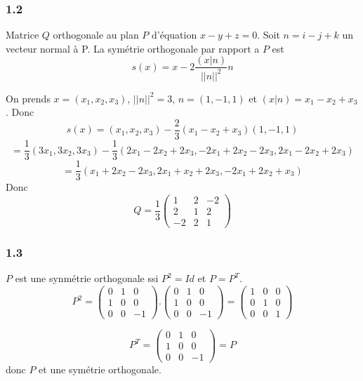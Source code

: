 \documentclass[]{book}
\theoremstyle{definition}
\begin{document}
\subsubsection*{1.2}
Matrice $Q$ orthogonale au plan $P$ d'\'equation $x-y+z=0$.
Soit $n = i-j+k$ un vecteur normal \`a P. La sym\'etrie orthogonale par rapport a $P$ est 
$$s(x) = x -2 \frac{(x|n)}{||n||^2}n$$

On prends $x=(x_1, x_2, x_3)$,  $||n||^2 = 3$, $n=(1,-1,1)$ et $(x|n) = x_1-x_2+x_3$. Donc
$$s(x) = (x_1, x_2, x_3) - \frac{2}{3}(x_1-x_2+x_3)(1,-1,1) $$
$$ = \frac{1}{3}(3x_1, 3x_2, 3x_3) - \frac{1}{3} (2x_1-2x_2+2x_3, -2x_1+2x_2-2x_3, 2x_1-2x_2+2x_3)$$
$$ = \frac{1}{3}(x_1+2x_2-2x_3, 2x_1+x_2+2x_3, -2x_1+2x_2+x_3)$$
Donc
$$ Q = \frac{1}{3}\begin{pmatrix} 1 & 2 & -2 \\ 2 & 1 & 2 \\ -2 & 2 & 1 \end{pmatrix} $$


\subsubsection*{1.3}
$P$ est une synm\'etrie orthogonale ssi $P^2 = Id$ et $P=P^T$.
$$
P^2 = \begin{pmatrix} 0 & 1 & 0 \\ 1 & 0 & 0 \\ 0 & 0 & -1 \end{pmatrix}.\begin{pmatrix} 0 & 1 & 0 \\ 1 & 0 & 0 \\ 0 & 0 & -1 \end{pmatrix} = \begin{pmatrix} 1 & 0 & 0 \\ 0 & 1 & 0 \\ 0 & 0 & 1 \end{pmatrix}
$$

$$
P^T = \begin{pmatrix} 0 & 1 & 0 \\ 1 & 0 & 0 \\ 0 & 0 & -1 \end{pmatrix} = P
$$
donc
$P$ et une sym\'etrie orthogonale.
\end{document}
